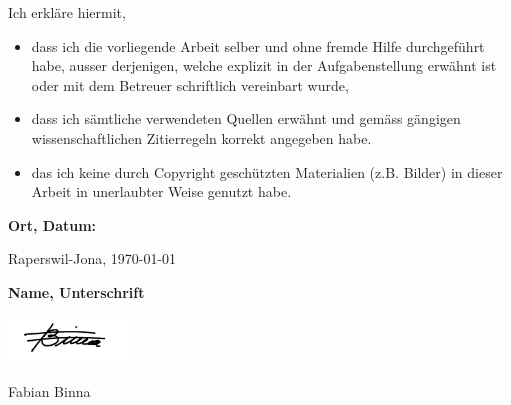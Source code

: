 \newpage
Ich erkläre hiermit,

\begin{itemize}
  \item dass ich die vorliegende Arbeit selber und ohne fremde Hilfe durchgeführt habe, ausser derjenigen, 
  welche explizit in der Aufgabenstellung erwähnt ist oder mit dem Betreuer schriftlich vereinbart wurde,
  \item dass ich sämtliche verwendeten Quellen erwähnt und gemäss gängigen 
  wissenschaftlichen Zitierregeln korrekt angegeben habe.
  \item das ich keine durch Copyright geschützten Materialien (z.B. Bilder) 
  in dieser Arbeit in unerlaubter Weise genutzt habe. 
\end{itemize}

\textbf{Ort, Datum:}

Raperswil-Jona, \today


\textbf{Name, Unterschrift}

\includegraphics[width=0.25\textwidth]{01_Einleitung/images/unterschrift-fbinna}

Fabian Binna